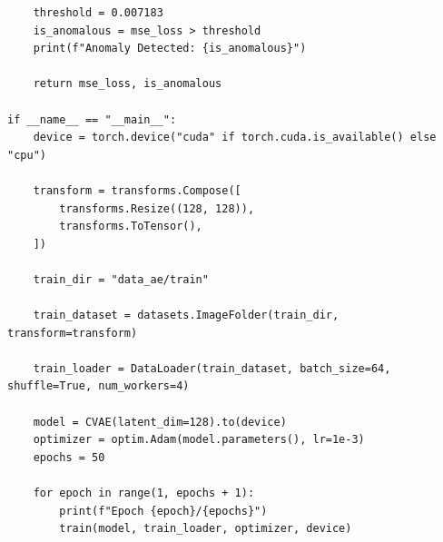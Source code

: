 \begin{verbatim}
    threshold = 0.007183
    is_anomalous = mse_loss > threshold
    print(f"Anomaly Detected: {is_anomalous}")

    return mse_loss, is_anomalous

if __name__ == "__main__":
    device = torch.device("cuda" if torch.cuda.is_available() else "cpu")

    transform = transforms.Compose([
        transforms.Resize((128, 128)),
        transforms.ToTensor(),
    ])

    train_dir = "data_ae/train"

    train_dataset = datasets.ImageFolder(train_dir, transform=transform)

    train_loader = DataLoader(train_dataset, batch_size=64, shuffle=True, num_workers=4)

    model = CVAE(latent_dim=128).to(device)
    optimizer = optim.Adam(model.parameters(), lr=1e-3)
    epochs = 50

    for epoch in range(1, epochs + 1):
        print(f"Epoch {epoch}/{epochs}")
        train(model, train_loader, optimizer, device)

\end{verbatim}

\newpage
